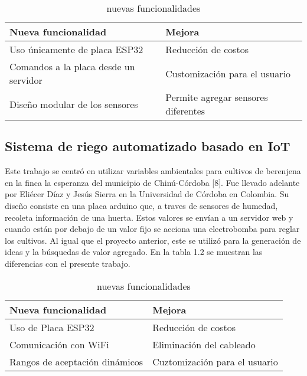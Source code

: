 \begin{table}[h]
	\centering
	\caption[Nuevas funcionalidades sobre el proyecto de Cadavid y Garcia]{nuevas funcionalidades}
	\begin{tabular}{l l}    
		\toprule
		\textbf{Nueva funcionalidad} & \textbf{Mejora}\\	
		\midrule
		Uso únicamente de placa ESP32           & Reducción de costos	\\		
		Comandos a la placa desde un servidor          & Customización para el usuario\\	
		Diseño modular de los sensores          & Permite agregar sensores diferentes\\	
		\bottomrule
		\hline
	\end{tabular}
	\label{tab:peces}
\end{table}

\subsection{Sistema de riego automatizado basado en IoT}
Este trabajo se centró en utilizar variables ambientales para cultivos de berenjena en la finca la esperanza del municipio de Chinú-Córdoba [8]. Fue llevado adelante por Eliécer Díaz y Jesús Sierra en la Universidad de Córdoba en Colombia. 
Su diseño consiste en una placa arduino que, a traves de sensores de humedad, recoleta información de una huerta. Estos valores se envían a un servidor web y cuando están por debajo de un valor fijo se acciona una electrobomba para reglar los cultivos. Al igual que el proyecto anterior, este se utilizó para la generación de ideas y la búsquedas de valor agregado. En la tabla 1.2 se muestran las diferencias con el presente trabajo.\\

\begin{table}[h]
	\centering
	\caption[Nuevas funcionalidades sobre el proyecto de Díaz y Sierra]{nuevas funcionalidades}
	\begin{tabular}{l l}    
		\toprule
		\textbf{Nueva funcionalidad} & \textbf{Mejora}\\	
		\midrule
		Uso de Placa ESP32           & Reducción de costos	\\		
		Comunicación con WiFi          & Eliminación del cableado\\	
		Rangos de aceptación dinámicos          & Cuztomización para el usuario\\		
		\bottomrule
		\hline
	\end{tabular}
	\label{tab:peces}\\
\end{table}

